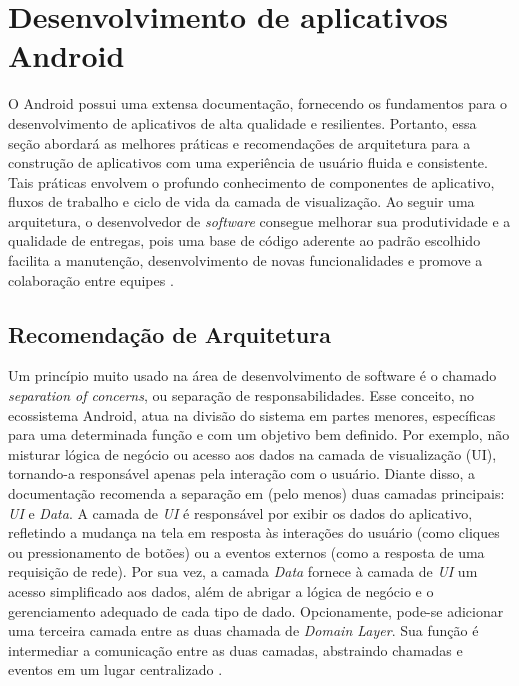 \section{Desenvolvimento de aplicativos Android}

O Android possui uma extensa documentação, fornecendo os fundamentos para o desenvolvimento de 
aplicativos de alta qualidade e resilientes. Portanto, essa seção abordará as melhores práticas e recomendações
de arquitetura para a construção de aplicativos com uma experiência de usuário fluida e consistente. Tais práticas envolvem o profundo
conhecimento de componentes de aplicativo, fluxos de trabalho e ciclo de vida da camada de visualização. Ao seguir uma arquitetura, 
o desenvolvedor de \textit{software} consegue melhorar sua produtividade e a qualidade de entregas, pois uma base de código aderente ao 
padrão escolhido facilita a manutenção, desenvolvimento de novas funcionalidades e promove a colaboração entre equipes \cite{google-developers-guideline}.

\subsection{Recomendação de Arquitetura}

Um princípio muito usado na área de desenvolvimento de software é o chamado \textit{separation of concerns}, ou separação de responsabilidades. Esse conceito, no ecossistema Android,
atua na divisão do sistema em partes menores, específicas para uma determinada função e com um objetivo bem definido. Por exemplo, não misturar lógica de 
negócio ou acesso aos dados na camada de visualização (UI), tornando-a  responsável apenas pela interação com o usuário. Diante disso, a documentação recomenda a separação em (pelo menos)
duas camadas principais: \textit{UI} e \textit{Data}. A camada de \textit{UI} é responsável por exibir os dados do aplicativo, refletindo a mudança na tela em resposta às
interações do usuário (como cliques ou pressionamento de botões) ou a eventos externos (como a resposta de uma requisição de rede). Por sua vez, a camada \textit{Data} fornece à camada de \textit{UI} 
um acesso simplificado aos dados, além de abrigar a lógica de negócio e o gerenciamento adequado de cada tipo de dado. Opcionamente, pode-se adicionar uma terceira camada entre as duas chamada de \textit{Domain Layer}.
Sua função é intermediar a comunicação entre as duas camadas, abstraindo chamadas e eventos em um lugar centralizado \cite{google-developers-guideline}.

